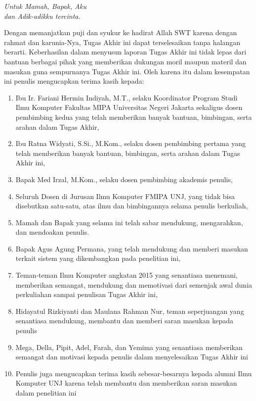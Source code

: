 \documentclass{jtetiskripsi}
\begin{document}
\cover


%


\acknowledgment
\begin{flushright}
	\emph{Untuk Mamah, Bapak, Aku\\dan Adik-adikku tercinta.}
\end{flushright}

\preface
\vspace{0.5cm}
Dengan memanjatkan puji dan syukur ke hadirat Allah SWT karena dengan rahmat dan karunia-Nya, Tugas Akhir ini dapat terselesaikan tanpa halangan berarti. Keberhasilan dalam menyusun laporan Tugas Akhir ini tidak lepas dari bantuan berbagai pihak yang memberikan dukungan moril maupun materil dan masukan guna sempurnanya Tugas Akhir ini. Oleh karena itu dalam kesempatan ini penulis mengucapkan terima kasih kepada:

\begin{enumerate}
	\item{Ibu Ir. Fariani Hermin Indiyah, M.T., selaku Koordinator Program Studi Ilmu Komputer Fakultas MIPA Universitas Negeri Jakarta sekaligus dosen pembimbing kedua yang telah memberikan banyak bantuan, bimbingan, serta arahan dalam Tugas Akhir,}
	\item{Ibu Ratna Widyati, S.Si., M.Kom., selaku dosen pembimbing pertama yang telah memberikan banyak bantuan, bimbingan, serta arahan dalam Tugas Akhir ini,}
	\item{Bapak Med Irzal, M.Kom., selaku dosen pembimbing akademis penulis,}
	\item{Seluruh Dosen di Jurusan Ilmu Komputer FMIPA UNJ, yang tidak bisa disebutkan satu-satu, atas ilmu dan bimbingannya selama penulis berkuliah,}
	\item{Mamah dan Bapak yang selama ini telah sabar mendukung, mengarahkan, dan mendoakan penulis.}
	\item{Bapak Agus Agung Permana, yang telah mendukung dan memberi masukan terkait sistem yang dikembangkan pada penelitian ini,}
	\item{Teman-teman Ilmu Komputer angkatan 2015 yang senantiasa menemani, memberikan semangat, mendukung dan memotivasi dari semenjak awal dunia perkuliahan sampai penulisan Tugas Akhir ini,}
	\item{Hidayatul Rizkiyanti dan Maulana Rahman Nur, teman seperjuangan yang senantiasa mendukung, membantu dan memberi saran masukan kepada penulis}
	\item {Mega, Della, Pipit, Adel, Farah, dan Yemima yang senantiasa memberikan semangat dan motivasi kepada penulis dalam menyelesaikan Tugas Akhir ini}
	\item{Penulis juga mengucapkan terima kasih sebesar-besarnya kepada alumni Ilmu Komputer UNJ karena telah membantu dan memberikan saran masukan dalam penelitian ini}
\end{enumerate}
\end{document}
